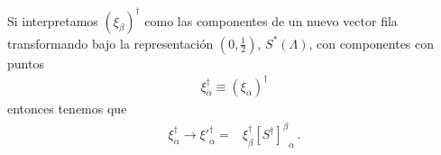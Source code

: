 \begin{frame}
Si interpretamos  $\left( \xi_\beta \right)^{\dagger}$ como las componentes de un nuevo vector fila transformando bajo la representación $(0,\frac{1}{2})$,
 $S^{*}(\Lambda)$, con componentes con puntos
\begin{align}
 \xi_{\dot{\alpha}}^{\dagger}\equiv \left( \xi_\alpha \right)^{\dagger}
\end{align}
entonces tenemos que 
\begin{align}
{\xi}_{\dot{\alpha}}^{\dagger}\to  {\xi'}_{\dot{\alpha}}^{\dagger}=& \xi_{\dot{\beta}}^{\dagger}{\left[{S^{\dagger}}\right]^{\dot{\beta}}}_{\dot{\alpha}}\,.
\end{align}
\end{frame}

